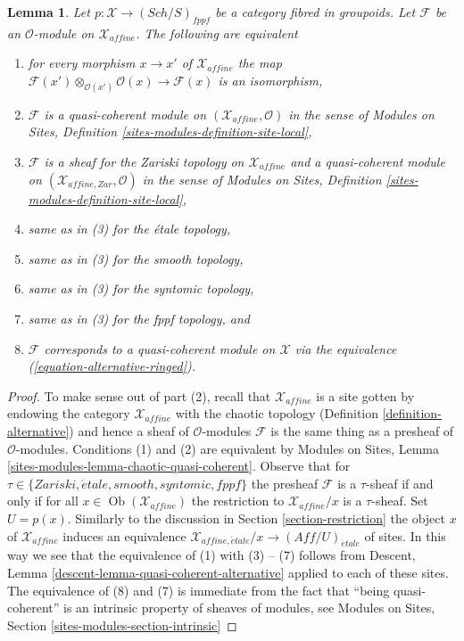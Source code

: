 \documentclass[10pt,a4paper]{amsart}
\theoremstyle{plain}
\newtheorem{lemma}[subsection]{Lemma}
\theoremstyle{definition}
\theoremstyle{remark}
\numberwithin{equation}{subsection}
\def\Sch{\mathit{Sch}}
\def\Ob{\mathop{\mathrm{Ob}}\nolimits}
\def\etale{{\acute{e}tale}}
\begin{document}
\begin{lemma}
\label{lemma-quasi-coherent-alternative}
Let $p : \mathcal{X} \to (\Sch/S)_{fppf}$ be a category fibred in groupoids.
Let $\mathcal{F}$ be an $\mathcal{O}$-module on $\mathcal{X}_{affine}$.
The following are equivalent
\begin{enumerate}
\item for every morphism $x \to x'$ of $\mathcal{X}_{affine}$ the map
$\mathcal{F}(x') \otimes_{\mathcal{O}(x')} \mathcal{O}(x) \to \mathcal{F}(x)$
is an isomorphism,
\item $\mathcal{F}$ is a quasi-coherent module on
$(\mathcal{X}_{affine}, \mathcal{O})$ in the sense of
Modules on Sites, Definition \ref{sites-modules-definition-site-local},
\item $\mathcal{F}$ is a sheaf for the Zariski topology on
$\mathcal{X}_{affine}$ and a quasi-coherent module on
$(\mathcal{X}_{affine, Zar}, \mathcal{O})$ in the sense of
Modules on Sites, Definition \ref{sites-modules-definition-site-local},
\item same as in (3) for the \'etale topology,
\item same as in (3) for the smooth topology,
\item same as in (3) for the syntomic topology,
\item same as in (3) for the fppf topology, and
\item $\mathcal{F}$ corresponds to a quasi-coherent module
on $\mathcal{X}$ via the equivalence (\ref{equation-alternative-ringed}).
\end{enumerate}
\end{lemma}

\begin{proof}
To make sense out of part (2), recall that $\mathcal{X}_{affine}$ is a site
gotten by endowing the category $\mathcal{X}_{affine}$ with the chaotic
topology (Definition \ref{definition-alternative}) and hence a sheaf
of $\mathcal{O}$-modules $\mathcal{F}$ is the same thing as
a presheaf of $\mathcal{O}$-modules. Conditions (1) and (2)
are equivalent by Modules on Sites, Lemma
\ref{sites-modules-lemma-chaotic-quasi-coherent}.
Observe that for $\tau \in \{Zariski, \etale, smooth, syntomic, fppf\}$
the presheaf $\mathcal{F}$ is a $\tau$-sheaf if and only if
for all $x \in \Ob(\mathcal{X}_{affine})$ the restriction
to $\mathcal{X}_{affine}/x$ is a $\tau$-sheaf. Set $U = p(x)$.
Similarly to the discussion in Section \ref{section-restriction}
the object $x$ of $\mathcal{X}_{affine}$ induces an equivalence
$\mathcal{X}_{affine, \etale}/x \to (\textit{Aff}/U)_\etale$ of sites.
In this way we see that the equivalence of (1) with (3) -- (7)
follows from Descent, Lemma \ref{descent-lemma-quasi-coherent-alternative}
applied to each of these sites. The equivalence of (8) and (7)
is immediate from the fact that ``being quasi-coherent'' is an
intrinsic property of sheaves of modules, see
Modules on Sites, Section \ref{sites-modules-section-intrinsic}
\end{proof}
\end{document}
